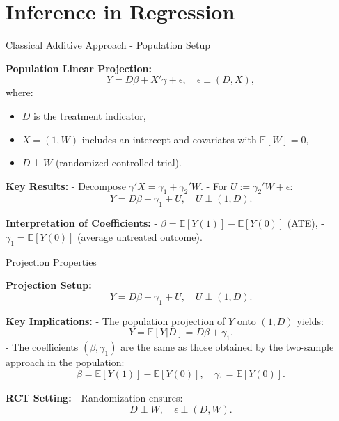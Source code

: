 \documentclass[xcolor=svgnames,t]{beamer}
\begin{document}
        



\section{Inference in Regression}

\begin{frame}{Classical Additive Approach - Population Setup}

    \textbf{Population Linear Projection:}
    \[
    Y = D \beta + X' \gamma + \epsilon, \quad \epsilon \perp (D, X),
    \]
    where:
    \begin{itemize}
        \item \(D\) is the treatment indicator,
        \item \(X = (1, W)\) includes an intercept and covariates with \(\mathbb{E}[W] = 0\),
        \item \(D \perp W\) (randomized controlled trial).
    \end{itemize}
    
    \textbf{Key Results:}
    - Decompose \(\gamma' X = \gamma_1 + \gamma_2' W\).
    - For \(U := \gamma_2' W + \epsilon\):
      \[
      Y = D \beta + \gamma_1 + U, \quad U \perp (1, D).
      \]
    
    \textbf{Interpretation of Coefficients:}
    - \(\beta = \mathbb{E}[Y(1)] - \mathbb{E}[Y(0)]\) (ATE),
    - \(\gamma_1 = \mathbb{E}[Y(0)]\) (average untreated outcome).
    
    \end{frame}
    

    \begin{frame}{Projection Properties}

        \textbf{Projection Setup:}
        \[
        Y = D \beta + \gamma_1 + U, \quad U \perp (1, D).
        \]
        
        \textbf{Key Implications:}
        - The population projection of \(Y\) onto \((1, D)\) yields:
          \[
          Y = \mathbb{E}[Y | D] = D \beta + \gamma_1.
          \]
        - The coefficients \((\beta, \gamma_1)\) are the same as those obtained by the two-sample approach in the population:
          \[
          \beta = \mathbb{E}[Y(1)] - \mathbb{E}[Y(0)], \quad \gamma_1 = \mathbb{E}[Y(0)].
          \]
        
        \textbf{RCT Setting:}
        - Randomization ensures:
          \[
          D \perp W, \quad \epsilon \perp (D, W).
          \]
        
        \end{frame}
        
\end{document}
